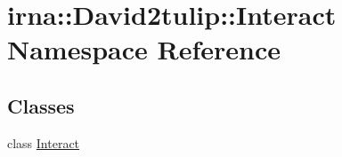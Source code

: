 \hypertarget{namespaceirna_1_1David2tulip_1_1Interact}{
\section{irna\-:\-:\-David2tulip\-:\-:\-Interact \-Namespace \-Reference}
\label{namespaceirna_1_1David2tulip_1_1Interact}
}
\subsection*{\-Classes}
\begin{DoxyCompactItemize}
\item 
class \hyperlink{classirna_1_1David2tulip_1_1Interact_1_1Interact}{\-Interact}
\end{DoxyCompactItemize}
